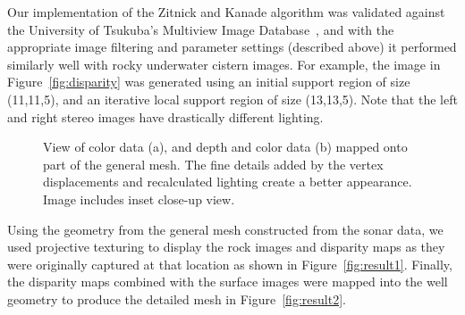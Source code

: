 \documentclass{llncs}
\begin{document}
Our implementation of the Zitnick and Kanade algorithm was validated against the University of Tsukuba's Multiview Image Database~\cite{stereo:zitKan}, and with the appropriate image filtering and parameter settings (described above) it performed similarly well with rocky underwater cistern images. For example, the image in Figure~\ref{fig:disparity} was generated using an initial support region of size (11,11,5), and an iterative local support region of size (13,13,5). Note that the left and right stereo images have drastically different lighting.
%
%
%
%
%
\begin{figure*}[!t]
	\centering
		\quad %
		\caption{View of color data (a), and depth and color data (b) mapped onto part of the general mesh. The fine details added by the vertex displacements and recalculated lighting create a better appearance. Image includes inset close-up view.}
		\label{fig:resultFull}
\end{figure*}
%
Using the geometry from the general mesh constructed from the sonar data, we used projective texturing to display the rock images and disparity maps as they were originally captured at that location as shown in Figure~\ref{fig:result1}. Finally, the disparity maps combined with the surface images were mapped into the well geometry to produce the detailed mesh in Figure~\ref{fig:result2}.
\end{document}
